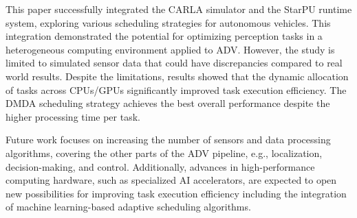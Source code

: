 \documentclass[conference]{IEEEtran}
\begin{document}
This paper successfully integrated the CARLA simulator and the StarPU runtime system, exploring various scheduling strategies for autonomous vehicles. This integration demonstrated the potential for optimizing perception tasks in a heterogeneous computing environment applied to ADV. However, the study is limited to simulated sensor data that could have discrepancies compared to real world results. Despite the limitations, results showed that the dynamic allocation of tasks across CPUs/GPUs significantly improved task execution efficiency. The DMDA scheduling strategy achieves the best overall performance despite the higher processing time per task.


Future work focuses on increasing the number of sensors and data processing algorithms, covering the other parts of the ADV pipeline, e.g., localization, decision-making, and control. Additionally, advances in high-performance computing hardware, such as specialized AI accelerators, are expected to open new possibilities for improving task execution efficiency including the integration of machine learning-based adaptive scheduling algorithms.


%
%













\end{document}
